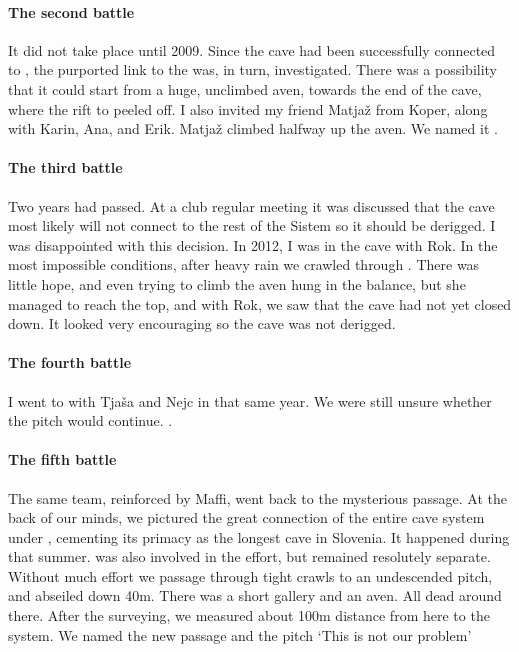 \paragraph{The second battle} It did not take place until 2009. Since the cave had been successfully connected to , the purported link to the  was, in turn, investigated. There was a possibility that it could start from a huge, unclimbed aven, towards the end of the cave, where the rift to  peeled off. I also invited my friend Matjaž from Koper, along with Karin, Ana, and Erik. Matjaž climbed halfway up the aven. We named it .


\paragraph {The third battle} Two years had passed. At a club regular meeting it was discussed that the cave most likely will not connect to the rest of the Sistem so it should be derigged. I was disappointed with this decision. In 2012, I was in the cave with Rok.  In the most impossible conditions, after heavy rain we crawled through . There was little hope, and even trying to climb the aven hung in the balance, but she managed to reach the top, and with Rok, we saw that the cave had not yet closed down. It looked very encouraging so the cave was not derigged. 


 \paragraph {The fourth battle} I went to  with Tja{\v{s}}a and Nejc in that same year. We were still unsure whether the pitch would continue. .


\paragraph{The fifth battle}  The same team, reinforced by Maffi, went back to the mysterious passage. At the back of our minds, we pictured the great connection of the entire cave system under , cementing its primacy as the longest cave in Slovenia. It happened during that summer.  was also involved in the effort, but remained resolutely separate. Without much effort we passage through tight crawls to an undescended pitch, and abseiled down 40m. There was a short gallery and an aven. All dead around there. After the surveying, we measured about 100m distance from here to the system. We named the new passage and the pitch `This is not our problem' 

